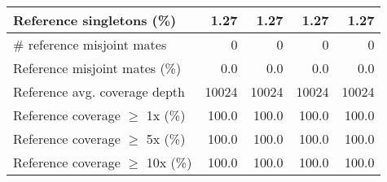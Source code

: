 \documentclass[12pt,a4paper]{article}
\begin{document}
\begin{table}[ht]
\begin{center}
\begin{tabular}{|l*{4}{|r}|}
Reference singletons (\%) & 1.27 & 1.27 & 1.27 & 1.27 \\ \hline
\# reference misjoint mates & 0 & 0 & 0 & 0 \\ \hline
Reference misjoint mates (\%) & 0.0 & 0.0 & 0.0 & 0.0 \\ \hline
Reference avg. coverage depth & 10024 & 10024 & 10024 & 10024 \\ \hline
Reference coverage $\geq$ 1x (\%) & 100.0 & 100.0 & 100.0 & 100.0 \\ \hline
Reference coverage $\geq$ 5x (\%) & 100.0 & 100.0 & 100.0 & 100.0 \\ \hline
Reference coverage $\geq$ 10x (\%) & 100.0 & 100.0 & 100.0 & 100.0 \\ \hline
\end{tabular}
\end{center}
\end{table}
\end{document}
